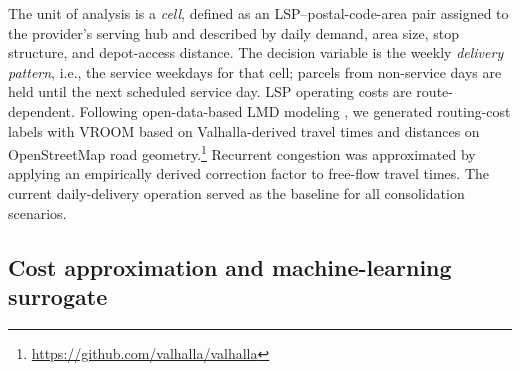\documentclass[preprint,12pt,authoryear]{elsarticle}
\begin{document}
The unit of analysis is a \emph{cell}, defined as an LSP--postal-code-area pair assigned to the provider's serving hub and described by daily demand, area size, stop structure, and depot-access distance. The decision variable is the weekly \emph{delivery pattern}, i.e., the service weekdays for that cell; parcels from non-service days are held until the next scheduled service day. LSP operating costs are route-dependent. Following open-data-based LMD modeling \citep{HORL2025104893}, we generated routing-cost labels with VROOM \citep{vroom_v1.14} based on Valhalla-derived travel times and distances on OpenStreetMap road geometry.\footnote{\url{https://github.com/valhalla/valhalla}} Recurrent congestion was approximated by applying an empirically derived correction factor to free-flow travel times. The current daily-delivery operation served as the baseline for all consolidation scenarios.







\subsection{Cost approximation and machine-learning surrogate}
\label{sec:cost_model}
\end{document}
